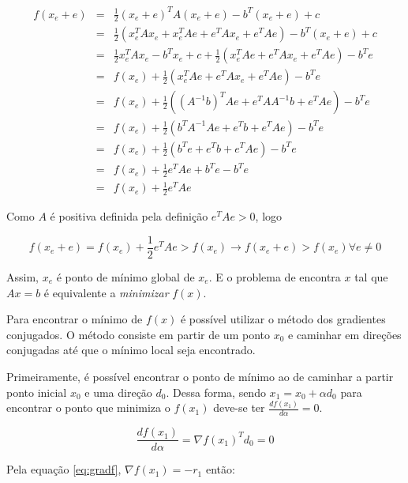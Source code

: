 \begin{eqnarray}
     f(x_e + e) & = & \frac{1}{2} (x_e + e)^T A (x_e + e) - b^T(x_e + e) + c \\
                & = & \frac{1}{2} (x_e^TAx_e + x_e^TAe + e^TAx_e + e^TAe )- b^T(x_e + e) + c \\
                & = & \frac{1}{2} x_e^TAx_e -b^Tx_e + c + \frac{1}{2} ( x_e^TAe + e^TAx_e + e^TAe ) - b^Te \\
                & = & f(x_e) + \frac{1}{2} ( x_e^TAe + e^TAx_e + e^TAe ) - b^Te \\
                & = & f(x_e) + \frac{1}{2} ( (A^{-1}b)^TAe + e^TAA^{-1}b + e^TAe ) - b^Te \\
                & = & f(x_e) + \frac{1}{2} ( b^TA^{-1}Ae + e^Tb + e^TAe ) - b^Te \\
                & = & f(x_e) + \frac{1}{2} ( b^Te + e^Tb + e^TAe ) - b^Te \\
                & = & f(x_e) + \frac{1}{2}  e^TAe  + b^Te - b^Te \\
                & = & f(x_e) + \frac{1}{2}  e^TAe
\end{eqnarray}


Como $A$ é positiva definida pela definição $e^TAe  > 0$, logo

\begin{equation}
    f(x_e + e) = f(x_e) + \frac{1}{2}  e^TAe > f(x_e)\rightarrow  f(x_e + e) > f(x_e) \forall e \neq 0
\end{equation}


Assim, $x_e$ é ponto de mínimo global de $x_e$. E o problema de encontra $x$ tal que $Ax = b$ é equivalente a \textit{minimizar} $f(x)$.

Para encontrar o mínimo de $f(x)$ é possível utilizar o método dos gradientes conjugados. O método consiste em partir de um ponto $x_0$ e caminhar em direções conjugadas até que o mínimo local seja encontrado.

Primeiramente, é possível encontrar o ponto de mínimo ao de caminhar a partir ponto inicial $x_0$ e uma direção $d_0$. Dessa forma, sendo $x_1 = x_0 + \alpha d_0$ para encontrar o ponto que minimiza o $f(x_1)$ deve-se ter $\frac{d f(x_1)}{d\alpha} = 0$.

\begin{equation}
    \frac{df(x_1)}{d \alpha} =  \nabla f(x_1)^T d_0 = 0
\end{equation}

Pela equação \ref{eq:gradf}, $\nabla f(x_1) = -r_1 $ então:


